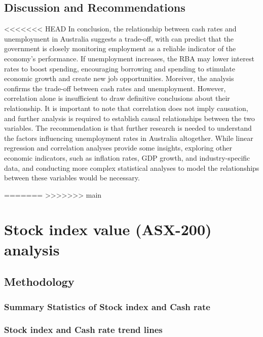 \documentclass[11pt,a4paper,]{article}
\begin{document}
\hypertarget{discussion-and-recommendations-2}{%
\subsection{Discussion and Recommendations}\label{discussion-and-recommendations-2}}

<<<<<<< HEAD
In conclusion, the relationship between cash rates and unemployment in Australia suggests a trade-off, with can predict that the government is closely monitoring employment as a reliable indicator of the economy's performance. If unemployment increases, the RBA may lower interest rates to boost spending, encouraging borrowing and spending to stimulate economic growth and create new job opportunities.
Moreiver, the analysis confirms the trade-off between cash rates and unemployment. However, correlation alone is insufficient to draw definitive conclusions about their relationship. It is important to note that correlation does not imply causation, and further analysis is required to establish causal relationships between the two variables.
The recommendation is that further research is needed to understand the factors influencing unemployment rates in Australia altogether. While linear regression and correlation analyses provide some insights, exploring other economic indicators, such as inflation rates, GDP growth, and industry-specific data, and conducting more complex statistical analyses to model the relationships between these variables would be necessary.

=======
>>>>>>> main
\hypertarget{stock-index-value-asx-200-analysis}{%
\section{Stock index value (ASX-200) analysis}\label{stock-index-value-asx-200-analysis}}

\hypertarget{methodology-3}{%
\subsection{Methodology}\label{methodology-3}}

\hypertarget{summary-statistics-of-stock-index-and-cash-rate}{%
\subsubsection{Summary Statistics of Stock index and Cash rate}\label{summary-statistics-of-stock-index-and-cash-rate}}

\hypertarget{stock-index-and-cash-rate-trend-lines}{%
\subsubsection{Stock index and Cash rate trend lines}\label{stock-index-and-cash-rate-trend-lines}}
\end{document}

